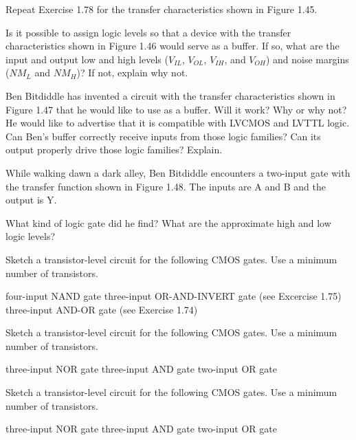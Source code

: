 \exercise %
Repeat Exercise 1.78 for the transfer characteristics shown in Figure 1.45.

\exercise %
Is it possible to assign logic levels so that a device with the transfer characteristics shown
in Figure 1.46 would serve as a buffer. If so, what are the input and output low and high
levels ($V_{IL}$, $V_{OL}$, $V_{IH}$, and $V_{OH}$) and noise margins ($NM_L$ and $NM_H$)?
If not, explain why not.

\exercise %
Ben Bitdiddle has invented a circuit with the transfer characteristics shown in Figure 1.47 that
he would like to use as a buffer. Will it work? Why or why not? He would like to advertise that
it is compatible with LVCMOS and LVTTL logic. Can Ben's buffer correctly receive inputs from
those logic families? Can its output properly drive those logic families? Explain.

\exercise %
While walking dawn a dark alley, Ben Bitdiddle encounters a two-input gate with the transfer
function shown in Figure 1.48. The inputs are A and B and the output is Y.
\begin{tasks}
	\task What kind of logic gate did he find?
	\task What are the approximate high and low logic levels?
\end{tasks}

\exercise %
Sketch a transistor-level circuit for the following CMOS gates. Use a minimum number of transistors.
\begin{tasks}
	\task four-input NAND gate
	\task three-input OR-AND-INVERT gate (see Excercise 1.75)
	\task three-input AND-OR gate (see Exercise 1.74)
\end{tasks}

\exercise %
Sketch a transistor-level circuit for the following CMOS gates. Use a minimum number of transistors.
\begin{tasks}
	\task three-input NOR gate
	\task three-input AND gate
	\task two-input OR gate
\end{tasks}

\exercise %
Sketch a transistor-level circuit for the following CMOS gates. Use a minimum number of transistors.
\begin{tasks}
	\task three-input NOR gate
	\task three-input AND gate
	\task two-input OR gate
\end{tasks}

